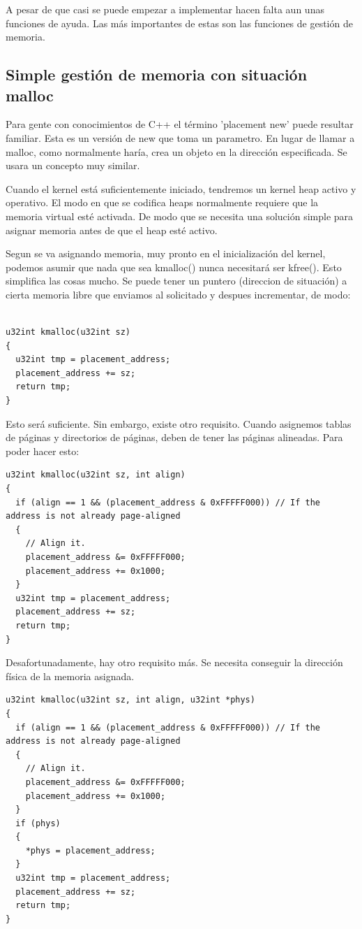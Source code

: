 \documentclass{report}
\begin{document}
A pesar de que casi se puede empezar a implementar hacen falta aun unas funciones de ayuda. Las más importantes de estas son las funciones de gestión de memoria. 


\subsection{Simple gestión de memoria con situación malloc}

Para gente con conocimientos de C++ el término 'placement new' puede resultar familiar. Esta es un versión de new que toma un parametro. En lugar de llamar a malloc, como normalmente haría, crea un objeto en la dirección especificada. Se usara un concepto muy similar.

Cuando el kernel está suficientemente iniciado, tendremos un kernel heap activo y operativo. El modo en que se codifica heaps normalmente requiere que la memoria virtual esté activada. De modo que se necesita una solución simple para asignar memoria antes de que el heap esté activo.

Segun se va asignando memoria, muy pronto en el inicialización del kernel, podemos asumir que nada que sea kmalloc() nunca necesitará ser kfree(). Esto simplifica las cosas mucho. Se puede tener un puntero (direccion de situación) a cierta memoria libre que enviamos al solicitado y despues incrementar, de modo:

\begin{lstlisting}

u32int kmalloc(u32int sz)
{
  u32int tmp = placement_address;
  placement_address += sz;
  return tmp;
}
\end{lstlisting}

Esto será suficiente. Sin embargo, existe otro requisito. Cuando asignemos tablas de páginas y directorios de páginas, deben de tener las páginas alineadas. Para poder hacer esto:

\begin{lstlisting}
u32int kmalloc(u32int sz, int align)
{
  if (align == 1 && (placement_address & 0xFFFFF000)) // If the address is not already page-aligned
  {
    // Align it.
    placement_address &= 0xFFFFF000;
    placement_address += 0x1000;
  }
  u32int tmp = placement_address;
  placement_address += sz;
  return tmp;
}
\end{lstlisting}

Desafortunadamente, hay otro requisito más. Se necesita conseguir la dirección física de la memoria asignada. 

\begin{lstlisting}
u32int kmalloc(u32int sz, int align, u32int *phys)
{
  if (align == 1 && (placement_address & 0xFFFFF000)) // If the address is not already page-aligned
  {
    // Align it.
    placement_address &= 0xFFFFF000;
    placement_address += 0x1000;
  }
  if (phys)
  {
    *phys = placement_address;
  }
  u32int tmp = placement_address;
  placement_address += sz;
  return tmp;
}
\end{lstlisting}
\end{document}
